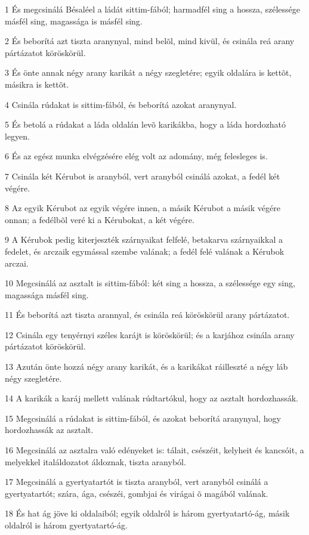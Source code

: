 \par 1 És megcsinálá Bésaléel a ládát sittim-fából; harmadfél sing a hossza, szélessége másfél sing, magassága is másfél sing.
\par 2 És beborítá azt tiszta aranynyal, mind belõl, mind kivül, és csinála reá arany pártázatot köröskörül.
\par 3 És önte annak négy arany karikát a négy szegletére; egyik oldalára is kettõt, másikra is kettõt.
\par 4 Csinála rúdakat is sittim-fából, és beborítá azokat aranynyal.
\par 5 És betolá a rúdakat a láda oldalán levõ karikákba, hogy a láda hordozható legyen.
\par 6 És az egész munka elvégzésére elég volt az adomány, még felesleges is.
\par 7 Csinála két Kérubot is aranyból, vert aranyból csinálá azokat, a fedél két végére.
\par 8 Az egyik Kérubot az egyik végére innen, a másik Kérubot a másik végére onnan; a fedélbõl veré ki a Kérubokat, a két végére.
\par 9 A Kérubok pedig kiterjeszték szárnyaikat felfelé, betakarva szárnyaikkal a fedelet, és arczaik egymással szembe valának; a fedél felé valának a Kérubok arczai.
\par 10 Megcsinálá az asztalt is sittim-fából: két sing a hossza, a szélessége egy sing, magassága másfél sing.
\par 11 És beborítá azt tiszta arannyal, és csinála reá köröskörül arany pártázatot.
\par 12 Csinála egy tenyérnyi széles karájt is köröskörül; és a karjához csinála arany pártázatot köröskörül.
\par 13 Azután önte hozzá négy arany karikát, és a karikákat ráilleszté a négy láb négy szegletére.
\par 14 A karikák a karáj mellett valának rúdtartókul, hogy az asztalt hordozhassák.
\par 15 Megcsinálá a rúdakat is sittim-fából, és azokat beborítá aranynyal, hogy hordozhassák az asztalt.
\par 16 Megcsinálá az asztalra való edényeket is: tálait, csészéit, kelyheit és kancsóit, a melyekkel italáldozatot áldoznak, tiszta aranyból.
\par 17 Megcsinálá a gyertyatartót is tiszta aranyból, vert aranyból csinálá a gyertyatartót; szára, ága, csészéi, gombjai és virágai õ magából valának.
\par 18 És hat ág jöve ki oldalaiból; egyik oldalról is három gyertyatartó-ág, másik oldalról is három gyertyatartó-ág.
